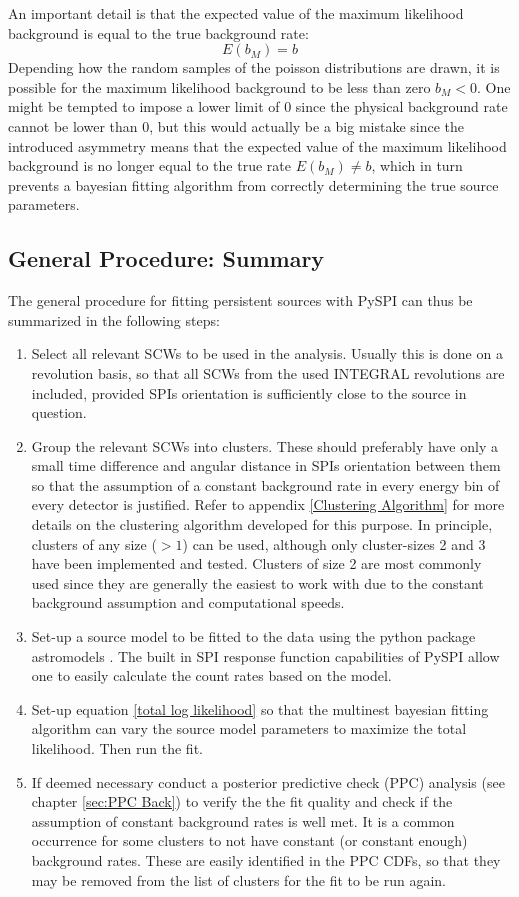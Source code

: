 \documentclass{report}
\begin{document}
An important detail is that the expected value of the maximum likelihood background is equal to the true background rate:
\begin{equation}
  E(b_M) = b
\end{equation}
Depending how the random samples of the poisson distributions are drawn, it is possible for the maximum likelihood background to be less than zero $b_M<0$. One might be tempted to impose a lower limit of 0 since the physical background rate cannot be lower than 0, but this would actually be a big mistake since the introduced asymmetry means that the expected value of the maximum likelihood background is no longer equal to the true rate $E(b_M) \neq b$, which in turn prevents a bayesian fitting algorithm from correctly determining the true source parameters.


\subsection{General Procedure: Summary}

The general procedure for fitting persistent sources with PySPI can thus be summarized in the following steps:
\begin{enumerate}
  \item Select all relevant SCWs to be used in the analysis. Usually this is done on a revolution basis, so that all SCWs from the used INTEGRAL revolutions are included, provided SPIs orientation is sufficiently close to the source in question.
  \item Group the relevant SCWs into clusters. These should preferably have only a small time difference and angular distance in SPIs orientation between them so that the assumption of a constant background rate in every energy bin of every detector is justified. Refer to appendix \ref{Clustering Algorithm} for more details on the clustering algorithm developed for this purpose. In principle, clusters of any size ($>1$) can be used, although only cluster-sizes 2 and 3 have been implemented and tested. Clusters of size 2 are most commonly used since they are generally the easiest to work with due to the constant background assumption and computational speeds.
  \item Set-up a source model to be fitted to the data using the python package astromodels \cite{astromodels}. The built in SPI response function capabilities of PySPI allow one to easily calculate the count rates based on the model.
  \item Set-up equation \ref{total log likelihood} so that the multinest bayesian fitting algorithm can vary the source model parameters to maximize the total likelihood. Then run the fit.
  \item If deemed necessary conduct a posterior predictive check (PPC) analysis (see chapter \ref{sec:PPC Back}) to verify the the fit quality and check if the assumption of constant background rates is well met. It is a common occurrence for some clusters to not have constant (or constant enough) background rates. These are easily identified in the PPC CDFs, so that they may be removed from the list of clusters for the fit to be run again.
\end{enumerate}
\end{document}
